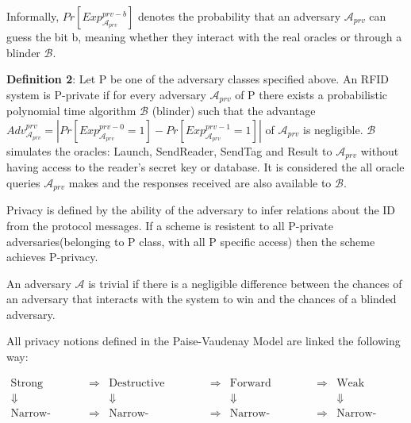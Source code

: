     Informally, $Pr[Exp_{\mathcal{A}_{prv}}^{prv-b}]$ denotes the probability that an adversary $\mathcal{A}_{prv}$
    can guess the bit b, meaning whether they interact with the real oracles or through a blinder $\mathcal{B}$.

    \textbf{Definition 2}: Let P be one of the adversary classes specified above. An RFID system is P-private if for
    every adversary $\mathcal{A}_{prv}$ of P there exists a probabilistic polynomial time algorithm $\mathcal{B}$ 
    (blinder) such that the advantage $Adv_{\mathcal{A}_{prv}}^{prv} = | Pr[Exp_{\mathcal{A}_{prv}}^{prv-0} = 1] - Pr[Exp_{\mathcal{A}_{prv}}^{prv-1} = 1] |$ 
    of $\mathcal{A}_{prv}$ is negligible. $\mathcal{B}$ simulates the oracles: Launch, SendReader, SendTag and
    Result to $\mathcal{A}_{prv}$ without having access to the reader's secret key or database. It is considered the all
    oracle queries $\mathcal{A}_{prv}$ makes and the responses received are also available to $\mathcal{B}$.

    Privacy is defined by the ability of the adversary to infer relations about the ID from the protocol
    messages. If a scheme is resistent to all P-private adversaries(belonging to P class, with all
    P specific access) then the scheme achieves P-privacy.

    An adversary $\mathcal{A}$ is trivial if there is a negligible difference between the chances
    of an adversary that interacts with the system to win and the chances of a blinded adversary.

    All privacy notions defined in the Paise-Vaudenay Model are linked the following way:

    \[
    \begin{array}{ccccccc}
        \text{Strong} & \Rightarrow & \text{Destructive} & \Rightarrow & \text{Forward} & \Rightarrow & \text{Weak} \\
        \Downarrow & &  \Downarrow  & &\Downarrow  & & \Downarrow \\
        \text{Narrow-Strong} & \Rightarrow & \text{Narrow-Destructive} & \Rightarrow & \text{Narrow-Forward} & \Rightarrow & \text{Narrow-Weak}
    \end{array}
    \]

